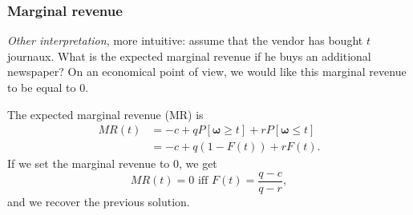 \documentclass{beamer}
\def\bomega{\boldsymbol\omega}
\begin{document}
\begin{frame}
\frametitle{Marginal revenue}

{\sl Other interpretation}, more intuitive: assume that the vendor has bought $t$ journaux.
What is the expected marginal revenue if he buys an additional newspaper?
On an economical point of view, we would like this marginal revenue to be equal to 0.

\mbox{}

The expected marginal revenue (MR) is
\begin{align*}
MR(t) &= -c + qP[\bomega \geq t] + rP[\bomega \leq t]\\
&= -c + q(1-F(t)) + rF(t).
\end{align*}
If we set the marginal revenue to 0, we get
$$
MR(t) = 0 \mbox{ iff } F(t) = \frac{q-c}{q-r},
$$
and we recover the previous solution.


\end{frame}
\end{document}
